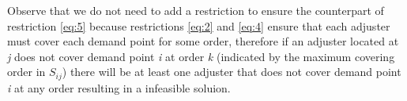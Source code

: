 %

Observe that
we do not need
to add a restriction
to ensure
the counterpart of restriction \ref{eq:5}
because restrictions \ref{eq:2} and \ref{eq:4}
ensure that
each adjuster
must cover each demand point
for some order,
therefore
if an adjuster located at \textit{j}
does not cover demand point \textit{i}
at order \textit{k}
(indicated by
the maximum covering order in $S_{ij}$)
there will be at least
one adjuster
that does not cover
demand point \textit{i}
at any order
resulting in a infeasible soluion.

